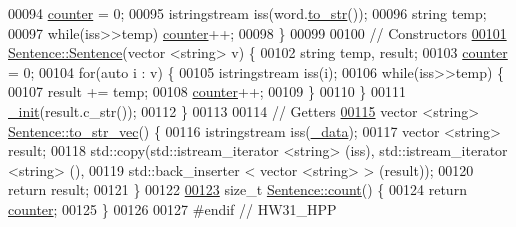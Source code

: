 \begin{DoxyCode}
00094     \hyperlink{classSentence_a5ad2286635c8e8620085b48f81ae2457}{counter} = 0;
00095     istringstream iss(word.\hyperlink{classWord_a75606ad31d249369f93c7ad83a6798e4}{to\_str}());
00096     \textcolor{keywordtype}{string} temp;
00097     \textcolor{keywordflow}{while}(iss>>temp) \hyperlink{classSentence_a5ad2286635c8e8620085b48f81ae2457}{counter}++;
00098 \}
00099 
00100 \textcolor{comment}{// Constructors}
\hypertarget{HW3_81_8hpp_source.tex_l00101}{}\hyperlink{classSentence_a6735a441c8edf1eab29687f70ce6697e}{00101} \hyperlink{classSentence_a3048354db110b3c53f22a0e73f8a2873}{Sentence::Sentence}(vector <string> v) \{
00102     \textcolor{keywordtype}{string} temp, result;
00103     \hyperlink{classSentence_a5ad2286635c8e8620085b48f81ae2457}{counter} = 0;
00104     \textcolor{keywordflow}{for}(\textcolor{keyword}{auto} i : v) \{
00105         istringstream iss(i);
00106         \textcolor{keywordflow}{while}(iss>>temp) \{
00107             result += temp;
00108             \hyperlink{classSentence_a5ad2286635c8e8620085b48f81ae2457}{counter}++;
00109         \}
00110     \}
00111     \hyperlink{classWord_a6a557d92243a1a4aa0f7a874b3c66a22}{\_init}(result.c\_str());
00112 \}
00113 
00114 \textcolor{comment}{// Getters}
\hypertarget{HW3_81_8hpp_source.tex_l00115}{}\hyperlink{classSentence_a1c2e3f16dbbaf2446a1d1f5ddac694d3}{00115} vector <string> \hyperlink{classSentence_a1c2e3f16dbbaf2446a1d1f5ddac694d3}{Sentence::to\_str\_vec}() \{
00116     istringstream iss(\hyperlink{classWord_adc46545d81f0158074f941731ae5bb52}{\_data});
00117     vector <string> result;
00118     std::copy(std::istream\_iterator <string> (iss), std::istream\_iterator <string> (),
00119               std::back\_inserter < vector <string> > (result));
00120     \textcolor{keywordflow}{return} result;
00121 \}
00122 
\hypertarget{HW3_81_8hpp_source.tex_l00123}{}\hyperlink{classSentence_a9775e8e13161099b03b281a31fcdf050}{00123} \textcolor{keywordtype}{size\_t} \hyperlink{classSentence_a9775e8e13161099b03b281a31fcdf050}{Sentence::count}() \{
00124     \textcolor{keywordflow}{return} \hyperlink{classSentence_a5ad2286635c8e8620085b48f81ae2457}{counter};
00125 \}
00126 
00127 \textcolor{preprocessor}{#endif  // HW31\_HPP}
\end{DoxyCode}
